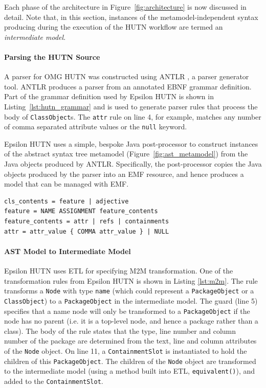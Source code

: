 Each phase of the architecture in Figure~\ref{fig:architecture} is now discussed in detail. Note that, in this section, instances of the metamodel-independent syntax producing during the execution of the HUTN workflow are termed an \textit{intermediate model}.

\paragraph{Parsing the HUTN Source}
A parser for OMG HUTN was constructed using ANTLR \cite{parr07antlr}, a parser generator tool. ANTLR produces a parser from an annotated EBNF grammar definition. Part of the grammar definition used by Epsilon HUTN is shown in Listing~\ref{lst:hutn_grammar} and is used to generate parser rules that process the body of \texttt{Cl\-a\-ssOb\-je\-ct}s. The \texttt{attr} rule on line 4, for example, matches any number of comma separated attribute values or the \texttt{null} keyword.

Epsilon HUTN uses a simple, bespoke Java post-processor to construct instances of the abstract syntax tree metamodel (Figure~\ref{fig:ast_metamodel}) from the Java objects produced by ANTLR. Specifically, the post-processor copies the Java objects produced by the parser into an EMF resource, and hence produces a model that can be managed with EMF.

\begin{lstlisting}[caption=An extract of the Epsilon HUTN grammar definition in EBNF, label=lst:hutn_grammar, language=EBNF]
cls_contents = feature | adjective
feature = NAME ASSIGNMENT feature_contents
feature_contents = attr | refs | containments
attr = attr_value { COMMA attr_value } | NULL
\end{lstlisting}

\paragraph{AST Model to Intermediate Model}
Epsilon HUTN uses ETL \cite{kolovos08etl} for specifying M2M transformation. One of the transformation rules from Epsilon HUTN is shown in Listing \ref{lst:m2m}. The rule transforms a \texttt{No\-de} with type \texttt{na\-me} (which could represent a \texttt{P\-ac\-ka\-geOb\-je\-ct} or a \texttt{Cl\-a\-ssOb\-je\-ct}) to a \texttt{P\-ac\-ka\-geOb\-je\-ct} in the intermediate model. The guard (line 5) specifies that a name node will only be transformed to a \texttt{P\-ac\-ka\-geOb\-je\-ct} if the node has no parent (i.e. it is a top-level node, and hence a package rather than a class). The body of the rule states that the type, line number and column number of the package are determined from the text, line and column attributes of the \texttt{No\-de} object. On line 11, a \texttt{Co\-nt\-ai\-nm\-e\-ntSl\-ot} is instantiated to hold the children of this \texttt{P\-ac\-ka\-geOb\-je\-ct}. The children of the \texttt{No\-de} object are transformed to the intermediate model (using a method built into ETL, \texttt{eq\-ui\-va\-lent()}), and added to the \texttt{Co\-nt\-ai\-nm\-e\-ntSl\-ot}.

